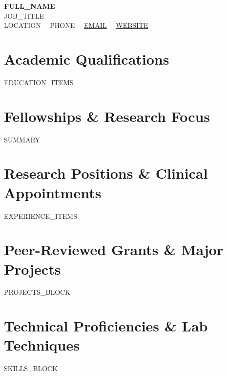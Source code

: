 \documentclass[10pt,letterpaper]{article}
\begin{document}
\begin{center}
  {\Huge \textbf{{{FULL_NAME}}}} \\[4pt]
  {\normalsize \textsc{{{JOB_TITLE}}}} \\[5pt]
  \small
  {{LOCATION}} \ \textbar \ 
  {{PHONE}} \ \textbar \ 
  \href{mailto:{{EMAIL}}}{{{EMAIL}}} \ \textbar \ 
  \href{https://{{WEBSITE}}}{{{WEBSITE}}}
\end{center}

\vspace{4pt}

\section{Academic Qualifications}
\small
{{EDUCATION_ITEMS}}

\section{Fellowships \& Research Focus}
\small
{{SUMMARY}}

\section{Research Positions \& Clinical Appointments}
\small
{{EXPERIENCE_ITEMS}}

\section{Peer-Reviewed Grants \& Major Projects}
\small
{{PROJECTS_BLOCK}}

\section{Technical Proficiencies \& Lab Techniques}
\small
{{SKILLS_BLOCK}}
\end{document}
